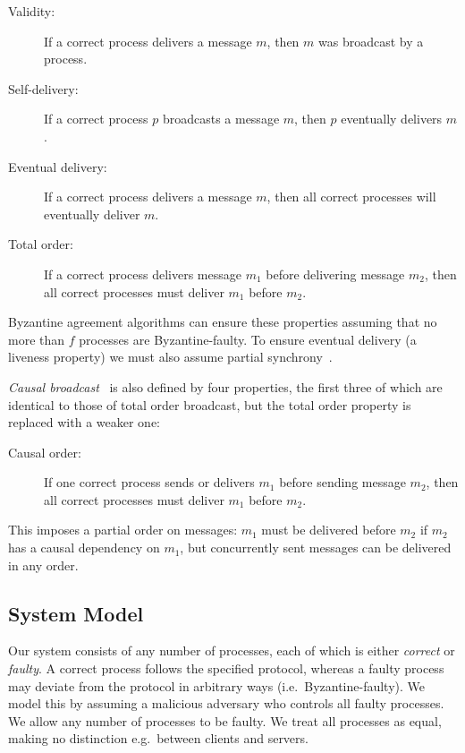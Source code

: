 \documentclass[a4paper,anonymous,USenglish]{lipics-v2019}
\begin{document}
\begin{description}
\item[Validity:] If a correct process delivers a message $m$, then $m$ was broadcast by a process.
\item[Self-delivery:] If a correct process $p$ broadcasts a message $m$, then $p$ eventually delivers $m$.
\item[Eventual delivery:] If a correct process delivers a message $m$, then all correct processes will eventually deliver $m$.
\item[Total order:] If a correct process delivers message $m_1$ before delivering message $m_2$, then all correct processes must deliver $m_1$ before $m_2$.
\end{description}

Byzantine agreement algorithms can ensure these properties assuming that no more than $f$ processes are Byzantine-faulty.
To ensure eventual delivery (a liveness property) we must also assume partial synchrony~\cite{Dwork:1988}.

\emph{Causal broadcast}~\cite{Birman:1991el} is also defined by four properties, the first three of which are identical to those of total order broadcast, but the total order property is replaced with a weaker one:

\begin{description}
\item[Causal order:] If one correct process sends or delivers $m_1$ before sending message $m_2$, then all correct processes must deliver $m_1$ before $m_2$.
\end{description}

This imposes a partial order on messages: $m_1$ must be delivered before $m_2$ if $m_2$ has a causal dependency on $m_1$, but concurrently sent messages can be delivered in any order.

\subsection{System Model}\label{sec:system-model}

Our system consists of any number of processes, each of which is either \emph{correct} or \emph{faulty}.
A correct process follows the specified protocol, whereas a faulty process may deviate from the protocol in arbitrary ways (i.e.\ Byzantine-faulty).
We model this by assuming a malicious adversary who controls all faulty processes.
We allow any number of processes to be faulty.
We treat all processes as equal, making no distinction e.g.\ between clients and servers.
\end{document}
